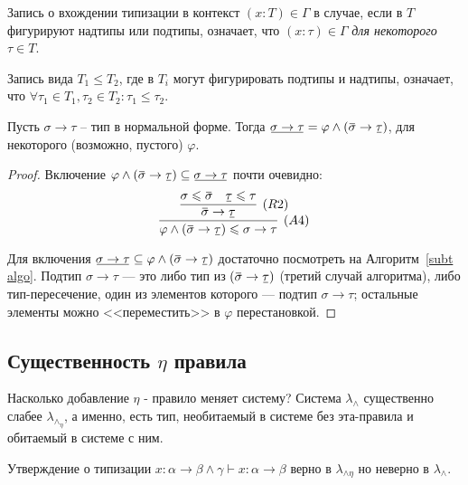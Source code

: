 \documentclass[../main.tex]{subfiles}
\begin{document}
Запись о вхождении типизации в контекст $(x \colon T) \in \Gamma$ в случае, если в $T$ фигурируют надтипы или подтипы, означает, что $(x \colon \tau) \in \Gamma$ {\it для некоторого} $\tau \in T$.

Запись вида $T_1 \leqslant T_2$, где в $T_i$ могут фигурировать подтипы и надтипы, означает, что $\forall \tau_1 \in T_1, \tau_2 \in T_2 : \tau_1 \leqslant \tau_2$.

\begin{lemma} \label{подтип стрелки}
Пусть $\sigma \to \tau$ -- тип в нормальной форме. Тогда
$\ub{\sigma \to \tau} = \varphi \wedge (\ob{\sigma} \to \ub{\tau})$,
для некоторого (возможно, пустого) $\varphi$.

\end{lemma}

\begin{proof}
    Включение $\varphi \wedge (\ob{\sigma} \to \ub{\tau}) \subseteq \ub{\sigma \to \tau}$ почти очевидно: 
    $$\infer[(A4)]{\varphi \wedge (\ob{\sigma} \to \ub{\tau}) \leqslant \sigma \to \tau}
                  {\infer[(R2)]{\ob{\sigma} \to \ub{\tau}}
                               {\sigma \leqslant \ob{\sigma} & \ub{\tau} \leqslant \tau}}$$
                               
    Для включения $\ub{\sigma \to \tau} \subseteq \varphi \wedge (\ob{\sigma} \to \ub{\tau})$ достаточно посмотреть на Алгоритм~\ref{subt algo}. Подтип $\sigma \to \tau$ --- это либо тип из $(\ob{\sigma} \to \ub{\tau})$ (третий случай алгоритма), либо тип-пересечение, один из элементов которого --- подтип $\sigma \to \tau$; остальные элементы можно <<переместить>> в $\varphi$ перестановкой.
\end{proof}


\subsection{Существенность $\eta$ правила}

Насколько добавление $\eta$ - правило меняет систему? 
Система $\lambda_\wedge$ существенно слабее $\lambda_\wedge_\eta$, а именно, есть тип, необитаемый в системе без эта-правила и обитаемый в системе с ним. 

\begin{lemma} \label{существенность: типизация}
Утверждение о типизации $x : \alpha \to \beta \wedge \gamma \vdash x : \alpha \to \beta$ верно в $\lambda_{\wedge \eta}$ но неверно в $\lambda_{\wedge}$.
\end{lemma}
\end{document}
